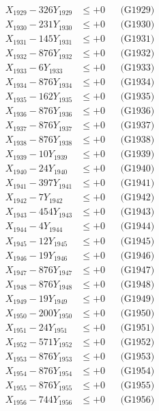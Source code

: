 \documentclass[a4paper,10pt]{article}
\begin{document}
{\begin{align}
X_{1929} - 326Y_{1929} &\leq +0 && \text{(G1929)} \\
X_{1930} - 231Y_{1930} &\leq +0 && \text{(G1930)} \\
\allowbreak
X_{1931} - 145Y_{1931} &\leq +0 && \text{(G1931)} \\
X_{1932} - 876Y_{1932} &\leq +0 && \text{(G1932)} \\
X_{1933} - 6Y_{1933} &\leq +0 && \text{(G1933)} \\
X_{1934} - 876Y_{1934} &\leq +0 && \text{(G1934)} \\
X_{1935} - 162Y_{1935} &\leq +0 && \text{(G1935)} \\
X_{1936} - 876Y_{1936} &\leq +0 && \text{(G1936)} \\
X_{1937} - 876Y_{1937} &\leq +0 && \text{(G1937)} \\
X_{1938} - 876Y_{1938} &\leq +0 && \text{(G1938)} \\
X_{1939} - 10Y_{1939} &\leq +0 && \text{(G1939)} \\
X_{1940} - 24Y_{1940} &\leq +0 && \text{(G1940)} \\
\allowbreak
X_{1941} - 397Y_{1941} &\leq +0 && \text{(G1941)} \\
X_{1942} - 7Y_{1942} &\leq +0 && \text{(G1942)} \\
X_{1943} - 454Y_{1943} &\leq +0 && \text{(G1943)} \\
X_{1944} - 4Y_{1944} &\leq +0 && \text{(G1944)} \\
X_{1945} - 12Y_{1945} &\leq +0 && \text{(G1945)} \\
X_{1946} - 19Y_{1946} &\leq +0 && \text{(G1946)} \\
X_{1947} - 876Y_{1947} &\leq +0 && \text{(G1947)} \\
X_{1948} - 876Y_{1948} &\leq +0 && \text{(G1948)} \\
X_{1949} - 19Y_{1949} &\leq +0 && \text{(G1949)} \\
X_{1950} - 200Y_{1950} &\leq +0 && \text{(G1950)} \\
\allowbreak
X_{1951} - 24Y_{1951} &\leq +0 && \text{(G1951)} \\
X_{1952} - 571Y_{1952} &\leq +0 && \text{(G1952)} \\
X_{1953} - 876Y_{1953} &\leq +0 && \text{(G1953)} \\
X_{1954} - 876Y_{1954} &\leq +0 && \text{(G1954)} \\
X_{1955} - 876Y_{1955} &\leq +0 && \text{(G1955)} \\
X_{1956} - 744Y_{1956} &\leq +0 && \text{(G1956)} \\

\end{align}}
\end{document}
